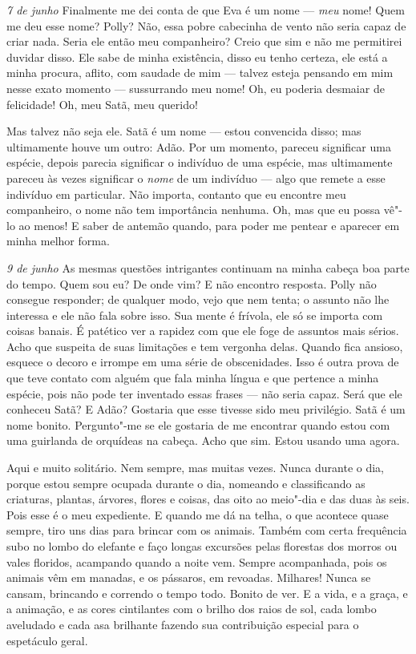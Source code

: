 \textit{7 de junho} Finalmente me dei conta de que Eva é um nome --- \textit{meu}
nome! Quem me deu esse nome? Polly? Não, essa pobre cabecinha de vento não seria
capaz de criar nada. Seria ele então meu companheiro? Creio que sim e não me
permitirei duvidar disso. Ele sabe de minha existência, disso eu tenho certeza,
ele está a minha procura, aflito, com saudade de mim --- talvez esteja pensando
em mim nesse exato momento --- sussurrando meu nome! Oh, eu poderia desmaiar de
felicidade! Oh, meu Satã, meu querido!

Mas talvez não seja ele. Satã é um nome --- estou convencida disso; mas
ultimamente houve um outro: Adão. Por um momento, pareceu significar uma
espécie, depois parecia significar o indivíduo de uma espécie, mas ultimamente
pareceu às vezes significar o \textit{nome} de um indivíduo --- algo que remete
a esse indivíduo em particular. Não importa, contanto que eu encontre meu
companheiro, o nome não tem importância nenhuma. Oh, mas que eu possa vê"-lo ao
menos! E saber de antemão quando, para poder me pentear e aparecer em minha
melhor forma.
\sectionitem


\textit{9 de junho} As mesmas questões intrigantes continuam na minha cabeça boa
parte do tempo. Quem sou eu? De onde vim? E não encontro resposta. Polly não
consegue responder; de qualquer modo, vejo que nem tenta; o assunto não
lhe interessa e ele não fala sobre isso. Sua mente é frívola, ele só se importa com
coisas banais. É patético ver a rapidez com que ele foge de assuntos mais
sérios. Acho que suspeita de suas limitações e tem vergonha delas. Quando
fica ansioso, esquece o decoro e irrompe em uma série de obscenidades. Isso é
outra prova de que teve contato com alguém que fala minha língua e que pertence a
minha espécie, pois não pode ter inventado essas frases --- não seria capaz.
Será que ele conheceu Satã? E Adão? Gostaria que esse tivesse sido
meu privilégio. Satã é um nome bonito. Pergunto"-me se ele gostaria de me
encontrar quando estou com uma guirlanda de orquídeas na cabeça. Acho que sim.
Estou usando uma agora.

Aqui e muito solitário. Nem sempre, mas muitas vezes. Nunca durante o dia, porque estou
sempre ocupada durante o dia, nomeando e classificando as criaturas, plantas,
árvores, flores e coisas, das oito ao meio"-dia e das duas às seis. Pois esse é o
meu expediente. E quando me dá na telha, o que acontece quase sempre, tiro uns
dias para brincar com os animais. Também com certa frequência subo no lombo do
elefante e faço longas excursões pelas florestas dos morros ou vales floridos,
acampando quando a noite vem. Sempre acompanhada, pois os animais vêm em
manadas, e os pássaros, em revoadas. Milhares! Nunca se cansam, brincando e
correndo o tempo todo. Bonito de ver. E a vida, e a graça, e a animação, e as
cores cintilantes com o brilho dos raios de sol, cada lombo aveludado e cada asa
brilhante fazendo sua contribuição especial para o espetáculo geral.

